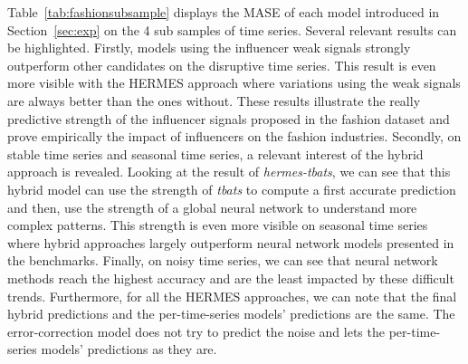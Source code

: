 \documentclass[10pt]{article} %
\begin{document}
{Table~\ref{tab:fashionsubsample} displays the MASE of each model introduced in Section~\ref{sec:exp} on the 4 sub samples of time series. Several relevant results can be highlighted. Firstly, models using the influencer weak signals strongly outperform other candidates on the disruptive time series. This result is even more visible with the HERMES approach where variations using the weak signals are always better than the ones without. These results illustrate the really predictive strength of the influencer signals proposed in the fashion dataset and prove empirically the impact of influencers on the fashion industries. Secondly, on stable time series and seasonal time series, a relevant interest of the hybrid approach is revealed. Looking at the result of \textit{hermes-tbats}, we can see that this hybrid model can use the strength of \textit{tbats} to compute a first accurate prediction and then, use the strength of a global neural network to understand more complex patterns. This strength is even more visible on seasonal time series where hybrid approaches largely outperform neural network models presented in the benchmarks. Finally, on noisy time series, we can see that neural network methods reach the highest accuracy and are the least impacted by these difficult trends. Furthermore, for all the HERMES approaches, we can note that the final hybrid predictions and the per-time-series models' predictions are the same. The error-correction model does not try to predict the noise and lets the per-time-series models' predictions as they are.}
\end{document}
